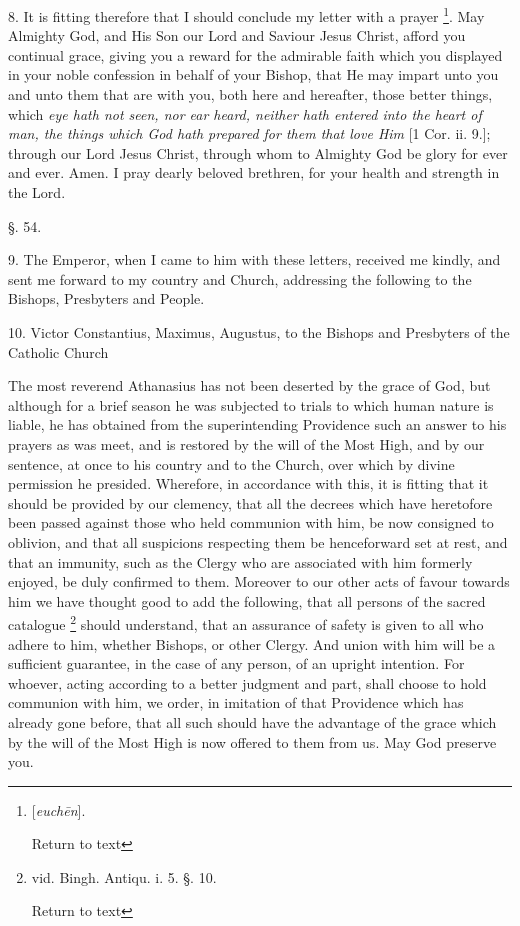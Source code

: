 8. It is fitting therefore that I should conclude
my letter with a prayer \footnote{[\emph{euch\={e}n}].

Return to text}.
May Almighty God, and His Son our Lord and Saviour Jesus Christ,
afford you continual grace, giving you a reward for the admirable
faith which you displayed in your noble confession in behalf of your
Bishop, that He may impart unto you and unto them that are with you,
both here and hereafter, those better things, which \emph{eye hath not
seen, nor ear heard, neither hath entered into the heart of man, the
things which God hath prepared for them that love Him} [1 Cor. ii.
9.]; through our Lord Jesus Christ, through whom to Almighty God be
glory for ever and ever. Amen. I pray dearly beloved brethren, for
your health and strength in the Lord.

§. 54.

9. The Emperor, when I came to him with these
letters, received me kindly, and sent me forward to my country and
Church, addressing the following to the Bishops, Presbyters and
People.

10. Victor Constantius, Maximus, Augustus, to the
Bishops and Presbyters of the Catholic Church

The most reverend Athanasius has not been
deserted by the grace of God, but although for a brief season he was
subjected to trials to which human nature is liable, he has obtained
from the superintending Providence such an answer to his prayers as
was meet, and is restored by the will of the Most High, and by our
sentence, at once to his country and to the Church, over which by
divine permission he presided. Wherefore, in accordance with
this, it is fitting that it should be provided by our clemency, that
all the decrees which have heretofore been passed against those who
held communion with him, be now consigned to oblivion, and that all
suspicions respecting them be henceforward set at rest, and that an
immunity, such as the Clergy who are associated with him formerly
enjoyed, be duly confirmed to them. Moreover to our other acts of
favour towards him we have thought good to add the following, that all
persons of the sacred catalogue \footnote{vid. Bingh. Antiqu. i. 5. §. 10.

Return to text} should understand, that an assurance of safety is given to all
who adhere to him, whether Bishops, or other Clergy. And union with
him will be a sufficient guarantee, in the case of any person, of an
upright intention. For whoever, acting according to a better judgment
and part, shall choose to hold communion with him, we order, in
imitation of that Providence which has already gone before, that all
such should have the advantage of the grace which by the will of the
Most High is now offered to them from us. May God preserve you.

